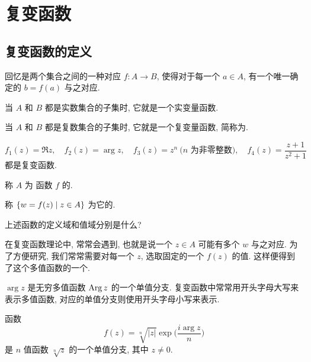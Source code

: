 \section{复变函数}

\subsection{复变函数的定义}

回忆是两个集合之间的一种对应 $f:A\to B$, 使得对于每一个 $a\in A$, 有一个唯一确定的 $b=f(a)$ 与之对应.
\begin{itempar}
  \item 当 $A$ 和 $B$ 都是实数集合的子集时, 它就是一个实变量函数.
  \item 当 $A$ 和 $B$ 都是复数集合的子集时, 它就是一个复变量函数, 简称为.
\end{itempar}

\begin{example}
  \[
    f_1(z)=\Re z,\quad
    f_2(z)=\arg z,\quad
    f_3(z)=z^n \ \text{($n$ 为非零整数)},\quad
    f_4(z)=\dfrac{z+1}{z^2+1}
  \]
  都是复变函数.
\end{example}

\begin{definition}
  \begin{enumpar}
    \item 称 $A$ 为 函数 $f$ 的.
    \item 称 ${\left\{w=f(z)\mid z\in A\right\}}$ 为它的.\footnotemark
  \end{enumpar} 
\end{definition}
\begin{exercise}
  上述函数的定义域和值域分别是什么?
\end{exercise}

在复变函数理论中, 常常会遇到, 也就是说一个 $z\in A$ 可能有多个 $w$ 与之对应.
为了方便研究, 我们常常需要对每一个 $z$, 选取固定的一个 $f(z)$ 的值.
这样便得到了这个多值函数的一个.
\begin{example}\delspace
  \begin{enumnopar}[(i)]
    \item $\arg z$ 是无穷多值函数 $\operatorname{Arg} z$ 的一个单值分支.
    复变函数中常常用开头字母大写来表示多值函数, 对应的单值分支则使用开头字母小写来表示.
    \item 函数
    \[
      f(z)=\sqrt[n]{|z|}\exp\bigl(\frac{i\arg z}n\bigr)
    \]
    是 $n$ 值函数 $\sqrt[n]z$ 的一个单值分支, 其中 $z\neq 0$.
  \end{enumnopar}
\end{example}

